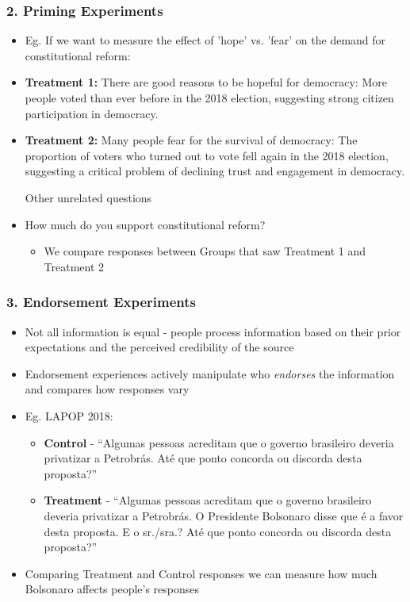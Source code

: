 \documentclass[xcolor=x11names,compress]{beamer}\usepackage[]{graphicx}\usepackage[]{color}
\renewcommand{\(}{\begin{columns}}
\renewcommand{\)}{\end{columns}}
\newcommand{\<}[1]{\begin{column}{#1}}
\renewcommand{\>}{\end{column}}
\begin{document}
\begin{frame}
\frametitle{2. Priming Experiments}
\begin{itemize}
\item Eg. If we want to measure the effect of 'hope' vs. 'fear' on the demand for constitutional reform:
\pause
\item \textbf{Treatment 1:} There are good reasons to be hopeful for democracy: More people voted than ever before in the 2018 election, suggesting strong citizen participation in democracy. 
\pause
\item \textbf{Treatment 2:} Many people fear for the survival of democracy: The proportion of voters who turned out to vote fell again in the 2018 election, suggesting a critical problem of declining trust and engagement in democracy.
\pause
\item [Other unrelated questions]
\pause
\item How much do you support constitutional reform?
\pause
\begin{itemize}
\item We compare responses between Groups that saw Treatment 1 and Treatment 2
\end{itemize}
\end{itemize}
\end{frame}

\begin{frame}
\frametitle{3. Endorsement Experiments}
\begin{itemize}
\item Not all information is equal - people process information based on their prior expectations and the perceived credibility of the source
\pause
\item Endorsement experiences actively manipulate who \textit{endorses} the information and compares how responses vary
\pause
\item Eg. LAPOP 2018: 
\begin{itemize}
\item \textbf{Control} - ``Algumas pessoas acreditam que o governo brasileiro deveria privatizar a Petrobrás. Até que ponto concorda ou discorda desta proposta?'' 
\pause
\item \textbf{Treatment} - ``Algumas pessoas acreditam que o governo brasileiro deveria privatizar a Petrobrás. O Presidente Bolsonaro disse que é a favor desta proposta. E o sr./sra.? Até que ponto concorda ou discorda desta proposta?''
\pause
\end{itemize}
\item Comparing Treatment and Control responses we can measure how much Bolsonaro affects people's responses
\end{itemize}
\end{frame}
\end{document}
